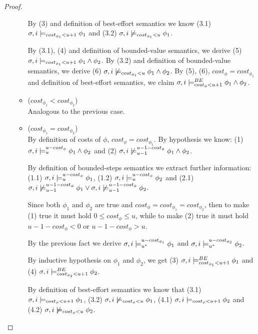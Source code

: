 \begin{theorem}
\begin{proof}
\begin{itemize}
\begin{itemize}
        By (3) and definition of best-effort semantics we know 
        (3.1) $\sigma, i \models_{cost_{\phi_1} < u + 1} \phi_1$ and (3.2) $\sigma, i \not\models_{cost_{\phi_1} < u} \phi_1$.

        By (3.1), (4) and definition of bounded-value semantics, we derive (5) $\sigma,i \models_{cost_{\phi_1} < u + 1} \phi_1 \land \phi_2$.
        By (3.2) and definition of bounded-value semantics, we derive (6) $\sigma,i \not\models_{cost_{\phi_1}< u} \phi_1 \land \phi_2$.
        By (5), (6), $cost_\phi = cost_{\phi_1}$ and definition of best-effort semantics, we claim $\sigma,i \models_{cost_\phi < u + 1}^{BE} \phi_1 \land \phi_2$.        
        
        \item ($cost_{\phi_1} < cost_{\phi_2}$) \\
        Analogous to the previous case.

        \item ($cost_{\phi_1} = cost_{\phi_2}$) \\
        By definition of costs of $\phi$, $cost_\phi = cost_{\phi_1}$.
        By hypothesis we know: 
        (1) $\sigma, i \models_{u}^{u-cost_\phi} \phi_1 \land \phi_2$ and
        (2) $\sigma, i \not\models_{u-1}^{u-1-cost_\phi} \phi_1 \land \phi_2$.
        
        By definition of bounded-steps semantics we extract further information: 
        (1.1) $\sigma,i \models_{u}^{u-cost_\phi} \phi_1$,
        (1.2) $\sigma,i \models_{u}^{u-cost_\phi} \phi_2$ and
        (2.1) $\sigma,i \not\models_{u-1}^{u-1-cost_\phi} \phi_1 \lor \sigma,i \not\models_{u-1}^{u-1-cost_\phi} \phi_2$.
        
        Since both $\phi_1$ and $\phi_2$ are true and $cost_\phi = cost_{\phi_1} = cost_{\phi_2}$, then to make (1) true it must hold $0 \leq cost_\phi \leq u$, while to make (2) true it must hold $u-1-cost_\phi < 0$ or $u-1-cost_\phi > u$. 

        By the previous fact we derive $\sigma,i \models_{{u}^*}^{u-cost_{\phi_1}} \phi_1$ and $\sigma,i \models_{{u}^*}^{u-cost_{\phi_2}} \phi_2$.
        
        By inductive hypothesis on $\phi_1$ and $\phi_2$, we get (3) $\sigma, i \models_{cost_{\phi_1} < u + 1}^{BE} \phi_1$ and (4) $\sigma,i \models_{cost_{\phi_2} < u + 1}^{BE} \phi_2$.
        
        By definition of best-effort semantics we know that
        (3.1) $\sigma, i \models_{cost_\phi < u + 1} \phi_1$,
        (3.2) $\sigma, i \not\models_{cost_\phi < u} \phi_1$,
        (4.1) $\sigma, i \models_{cost_\phi < u + 1} \phi_2$ and 
        (4.2) $\sigma, i \not\models_{cost_\phi < u} \phi_2$.


\end{itemize}
\end{itemize}
\end{proof}
\end{theorem}
